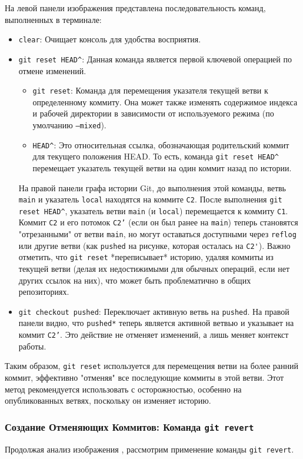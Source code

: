 На левой панели изображения представлена последовательность команд, выполненных в терминале:
\begin{itemize}
    \item \texttt{clear}: Очищает консоль для удобства восприятия.
    \item \texttt{git reset HEAD\^}: Данная команда является первой ключевой операцией по отмене изменений.
    \begin{itemize}
        \item \texttt{git reset}: Команда для перемещения указателя текущей ветви к определенному коммиту.
        Она может также изменять содержимое индекса и рабочей директории в зависимости от используемого режима (по умолчанию \texttt{--mixed}).
        \item \texttt{HEAD\^}: Это относительная ссылка, обозначающая родительский коммит для текущего положения HEAD. То есть, команда \texttt{git reset HEAD\^} перемещает указатель текущей ветви на один коммит назад по истории.
    \end{itemize}
    На правой панели графа истории Git, до выполнения этой команды, ветвь \texttt{main} и указатель \texttt{local} находятся на коммите \texttt{C2}.
    После выполнения \texttt{git reset HEAD\^}, указатель ветви \texttt{main} (и \texttt{local}) перемещается к коммиту \texttt{C1}.
    Коммит \texttt{C2} и его потомок \texttt{C2'} (если он был ранее на \texttt{main}) теперь становятся "отрезанными" от ветви \texttt{main}, но могут оставаться доступными через \texttt{reflog} или другие ветви (как \texttt{pushed} на рисунке, которая осталась на \texttt{C2\'}).
    Важно отметить, что \texttt{git reset} *переписывает* историю, удаляя коммиты из текущей ветви (делая их недостижимыми для обычных операций, если нет других ссылок на них), что может быть проблематично в общих репозиториях.
    \item \texttt{git checkout pushed}: Переключает активную ветвь на \texttt{pushed}.
    На правой панели видно, что \texttt{pushed*} теперь является активной ветвью и указывает на коммит \texttt{C2'}.
    Это действие не отменяет изменений, а лишь меняет контекст работы.
\end{itemize}
Таким образом, \texttt{git reset} используется для перемещения ветви на более ранний коммит, эффективно "отменяя" все последующие коммиты в этой ветви.
Этот метод рекомендуется использовать с осторожностью, особенно на опубликованных ветвях, поскольку он изменяет историю.

\subsubsection{Создание Отменяющих Коммитов: Команда \texttt{git revert}}\label{subsubsec:git-revert}
Продолжая анализ изображения , рассмотрим применение команды \texttt{git revert}.

